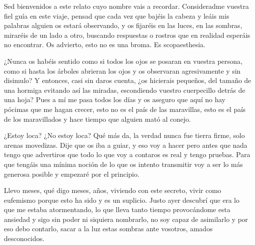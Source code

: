 Sed bienvenidos a este relato cuyo nombre vais a recordar. Consideradme vuestra fiel guía en este viaje, pensad que cada vez que bajéis la cabeza y leáis mis palabras alguien os estará observando, y os fijaréis en las luces, en las sombras, miraréis de un lado a otro, buscando respuestas o rostros que en realidad esperáis no encontrar.  Os advierto, esto no es una broma.  Es scopaesthesia. 

¿Nunca os habéis sentido como si todos los ojos se posaran en vuestra persona, como si hasta los árboles abrieran los ojos y os observaran agresivamente y sin disimulo? Y entonces, casi sin daros cuenta, ¿os hicierais pequeños, del tamaño de una hormiga evitando así las miradas, escondiendo vuestro cuerpecillo detrás de una hoja? Pues a mí me pasa todos los días y os aseguro que aquí no hay pócimas que me hagan crecer, esto no es el país de las maravillas, esto es el país de los maravillados y hace tiempo que alguien mató al conejo. 

¿Estoy loca? ¿No estoy loca? Qué más da, la verdad nunca fue tierra firme, solo arenas movedizas. Dije que os iba a guiar, y eso voy a hacer pero antes que nada tengo que advertiros que todo lo que voy a contaros es real y tengo pruebas.  Para que tengáis una mínima noción de lo que os intento transmitir voy a ser lo más generosa posible y empezaré por el principio. 

Llevo meses, qué digo meses, años, viviendo con este secreto,  vivir como eufemismo porque esto ha sido y es un suplicio. Justo ayer descubrí que era lo que me estaba atormentando, lo que lleva tanto tiempo provocándome esta ansiedad y sigo sin poder ni siquiera nombrarlo, no soy capaz de asimilarlo y por eso debo contarlo, sacar a la luz estas sombras ante vosotros, amados desconocidos.  

